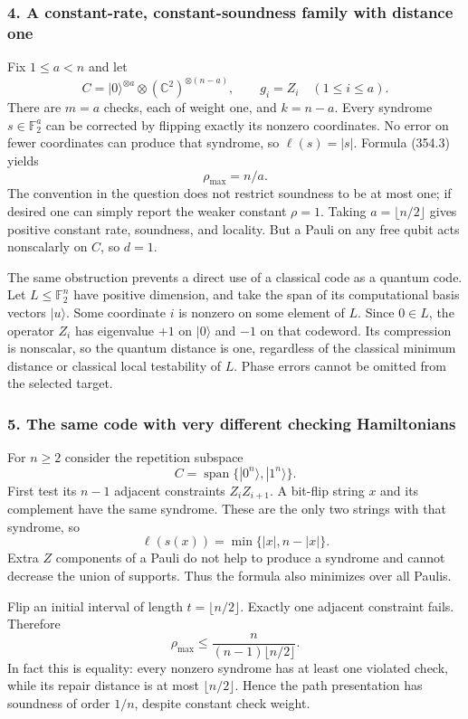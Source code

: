 \documentclass[11pt]{article}
\begin{document}
\subsubsection{4. A constant-rate, constant-soundness family with distance one}
Fix $1\le a<n$ and let
\[
 C=|0\rangle^{\otimes a}\otimes(\mathbb C^2)^{\otimes(n-a)},
 \qquad g_i=Z_i\quad(1\le i\le a).
\]
There are $m=a$ checks, each of weight one, and $k=n-a$. Every syndrome $s\in\mathbb F_2^a$ can be corrected by flipping exactly its nonzero coordinates. No error on fewer coordinates can produce that syndrome, so $\ell(s)=|s|$. Formula (354.3) yields
\[
 \rho_{\max}=n/a.
 \tag{354.11}
\]
The convention in the question does not restrict soundness to be at most one; if desired one can simply report the weaker constant $\rho=1$. Taking $a=\lfloor n/2\rfloor$ gives positive constant rate, soundness, and locality. But a Pauli on any free qubit acts nonscalarly on $C$, so $d=1$.

The same obstruction prevents a direct use of a classical code as a quantum code. Let $L\le\mathbb F_2^n$ have positive dimension, and take the span of its computational basis vectors $|u\rangle$. Some coordinate $i$ is nonzero on some element of $L$. Since $0\in L$, the operator $Z_i$ has eigenvalue $+1$ on $|0\rangle$ and $-1$ on that codeword. Its compression is nonscalar, so the quantum distance is one, regardless of the classical minimum distance or classical local testability of $L$. Phase errors cannot be omitted from the selected target.

\subsubsection{5. The same code with very different checking Hamiltonians}
For $n\ge2$ consider the repetition subspace
\[
 C=\operatorname{span}\{|0^n\rangle,|1^n\rangle\}.
\]
First test its $n-1$ adjacent constraints $Z_iZ_{i+1}$. A bit-flip string $x$ and its complement have the same syndrome. These are the only two strings with that syndrome, so
\[
 \ell(s(x))=\min\{|x|,n-|x|\}.
 \tag{354.12}
\]
Extra $Z$ components of a Pauli do not help to produce a syndrome and cannot decrease the union of supports. Thus the formula also minimizes over all Paulis.

Flip an initial interval of length $t=\lfloor n/2\rfloor$. Exactly one adjacent constraint fails. Therefore
\[
 \rho_{\max}\le\frac{n}{(n-1)\lfloor n/2\rfloor}.
 \tag{354.13}
\]
In fact this is equality: every nonzero syndrome has at least one violated check, while its repair distance is at most $\lfloor n/2\rfloor$. Hence the path presentation has soundness of order $1/n$, despite constant check weight.
\end{document}
